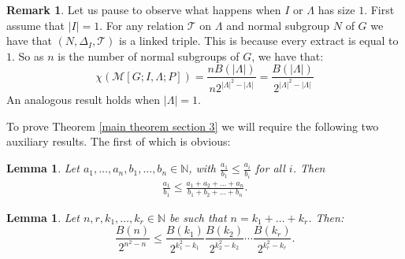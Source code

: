 \documentclass[a4paper, 12pt,reqno]{amsart}
\theoremstyle{plain}
\newtheorem{lemma}[thm]{Lemma}
\theoremstyle{definition}
\newtheorem{remark}[thm]{Remark}
\theoremstyle{remark}
\newcommand{\N}{\mathbb{N}}
\newcommand{\RM}{\mathcal{M}[G;I,\Lambda;P]}
\begin{document}
\begin{remark}
    \label{index sets have size 1 case}
    Let us pause to observe what happens when $I$ or $\Lambda$ has size $1$.
    First assume that $|I| = 1$. For any relation $\mathcal{T}$ on $\Lambda$ and normal subgroup $N$ of $G$ we have that $(N,\Delta_I,\mathcal{T})$ is a linked triple.
    This is because every extract is equal to $1$.
    So as $n$ is the number of normal subgroups of $G$, we have that:
    \begin{equation*}
        \chi(\RM) = \frac{n B(|\Lambda|)}{n 2^{|\Lambda|^2 - |\Lambda|} } = \frac{ B(|\Lambda|)}{ 2^{|\Lambda|^2 - |\Lambda|}}
    \end{equation*}
    An analogous result holds when $|\Lambda| = 1$.
\end{remark}

To prove Theorem \ref{main theorem section 3} we will require the following two auxiliary results. The first of which is obvious:
\begin{lemma}
    \label{elementary fraction result}
    Let $a_1 , \dots , a_n , b_1 , \dots , b_n \in \N$, with $\frac{a_1}{b_1} \leq \frac{a_i}{b_i}$ for all $i$.
    Then
    \begin{align*}
        \frac{a_1}{b_1} \leq \frac{a_1 + a_2 + \dots + a_n}{b_1 + b_2 + \dots + b_n}. \tag*{\qed}
    \end{align*}
\end{lemma}

\begin{lemma}
    \label{Bell number inequality}
    Let $n , r , k_1 , \dots , k_r \in \N$ be such that $n = k_1 + \dots + k_r$.
    Then:
    \begin{equation*}
        \frac{B(n)}{2^{n^2 - n}} \leq \frac{B(k_1)}{2^{k_1^2 - k_1}} \frac{B(k_2)}{2^{k_2^2 - k_2}} \cdots \frac{B(k_r)}{2^{k_r^2 - k_r}}.
    \end{equation*}
\end{lemma}
\end{document}
